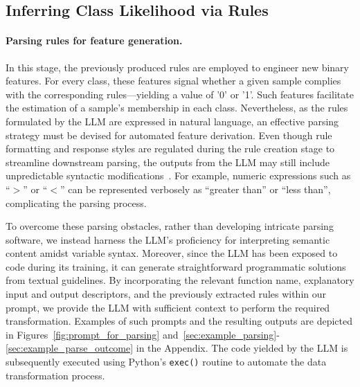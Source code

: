 \subsection{Inferring Class Likelihood via Rules}
\label{Sec:training}

\paragraph{Parsing rules for feature generation.} In this stage, the previously produced rules are employed to engineer new binary features. For every class, these features signal whether a given sample complies with the corresponding rules—yielding a value of '0' or '1'. Such features facilitate the estimation of a sample’s membership in each class. Nevertheless, as the rules formulated by the LLM are expressed in natural language, an effective parsing strategy must be devised for automated feature derivation. Even though rule formatting and response styles are regulated during the rule creation stage to streamline downstream parsing, the outputs from the LLM may still include unpredictable syntactic modifications~\cite{kovavc2023large}. For example, numeric expressions such as ``$>$” or ``$<$” can be represented verbosely as ``greater than” or ``less than”, complicating the parsing process.

To overcome these parsing obstacles, rather than developing intricate parsing software, we instead harness the LLM’s proficiency for interpreting semantic content amidst variable syntax. Moreover, since the LLM has been exposed to code during its training, it can generate straightforward programmatic solutions from textual guidelines. By incorporating the relevant function name, explanatory input and output descriptors, and the previously extracted rules within our prompt, we provide the LLM with sufficient context to perform the required transformation. Examples of such prompts and the resulting outputs are depicted in Figures~\ref{fig:prompt_for_parsing} and~\ref{sec:example_parsing}-\ref{sec:example_parse_outcome} in the Appendix. The code yielded by the LLM is subsequently executed using Python’s \texttt{exec()} routine to automate the data transformation process.

\vspace*{-0.12in}
